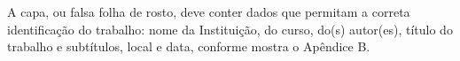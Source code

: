 \begin{Desenvolvimento}
A capa, ou falsa folha de rosto, deve conter dados que permitam a correta identificação do trabalho: nome da Instituição, do curso, do(s) autor(es), título do trabalho e subtítulos, local e data, conforme mostra o Apêndice B.

\end{Desenvolvimento}

